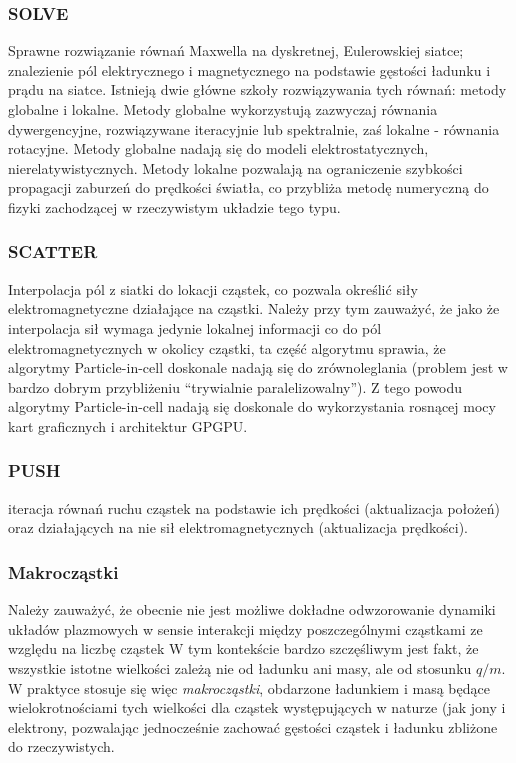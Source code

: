     \subsubsection{SOLVE}
    Sprawne rozwiązanie równań Maxwella na dyskretnej, Eulerowskiej siatce;
    znalezienie pól elektrycznego i magnetycznego
    na podstawie gęstości ładunku i prądu na siatce.
    Istnieją dwie główne szkoły rozwiązywania tych równań: metody globalne i lokalne. Metody globalne wykorzystują
    zazwyczaj równania dywergencyjne, rozwiązywane iteracyjnie lub spektralnie,
    zaś lokalne - równania rotacyjne. Metody globalne nadają się do modeli elektrostatycznych, nierelatywistycznych.
    Metody lokalne pozwalają na ograniczenie szybkości propagacji zaburzeń do prędkości światła, co przybliża
    metodę numeryczną do fizyki zachodzącej w rzeczywistym układzie tego typu.
    \subsubsection{SCATTER}
    Interpolacja pól z siatki do lokacji cząstek, co pozwala określić siły elektromagnetyczne działające na cząstki.
    Należy przy tym zauważyć, że jako że interpolacja sił wymaga jedynie lokalnej informacji co do pól
    elektromagnetycznych w okolicy cząstki, ta część algorytmu sprawia, że algorytmy Particle-in-cell doskonale
    nadają się do zrównoleglania (problem jest w bardzo dobrym przybliżeniu ``trywialnie paralelizowalny''). Z tego powodu algorytmy
    Particle-in-cell nadają się doskonale do wykorzystania rosnącej mocy kart graficznych i architektur GPGPU.
    \subsubsection{PUSH}
    iteracja równań ruchu cząstek na podstawie ich prędkości (aktualizacja położeń)
    oraz działających na nie sił elektromagnetycznych (aktualizacja prędkości).

    \subsubsection{Makrocząstki}
    Należy zauważyć, że obecnie nie jest możliwe dokładne odwzorowanie dynamiki układów plazmowych w sensie interakcji
    między poszczególnymi cząstkami ze względu na liczbę cząstek %
    W tym kontekście bardzo szczęśliwym jest fakt, że wszystkie istotne wielkości zależą nie od ładunku ani masy,
    ale od stosunku $q/m$. W praktyce stosuje się więc \emph{makrocząstki}, obdarzone ładunkiem i masą będące wielokrotnościami
    tych wielkości dla cząstek występujących w naturze (jak jony i elektrony, pozwalając jednocześnie zachować gęstości
    cząstek i ładunku %
    zbliżone do rzeczywistych.


